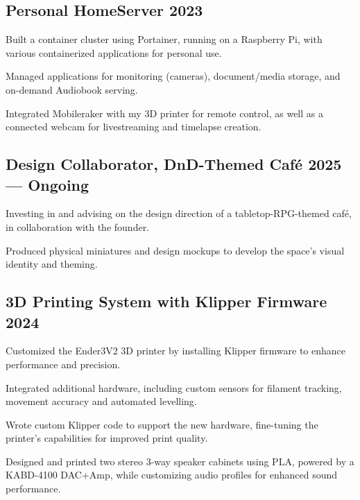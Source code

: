 \subsection{\texorpdfstring{Personal HomeServer \hfill 2023}{Personal HomeServer - 2023}}
\begin{zitemize}
\item Built a container cluster using Portainer, running on a Raspberry Pi, with various containerized applications for personal use.
\item Managed applications for monitoring (cameras), document/media storage, and on-demand Audiobook serving.
\item Integrated Mobileraker with my 3D printer for remote control, as well as a connected webcam for livestreaming and timelapse creation.
\end{zitemize}

\subsection{\texorpdfstring{Design Collaborator, DnD-Themed Caf\'{e} \hfill 2025 --- Ongoing}{Design Collaborator, DnD-Themed Cafe - 2025 - Ongoing}}
\begin{zitemize}
\item Investing in and advising on the design direction of a tabletop-RPG-themed caf\'{e}, in collaboration with the founder.
\item Produced physical miniatures and design mockups to develop the space's visual identity and theming.
\end{zitemize}

\subsection{\texorpdfstring{3D Printing System with Klipper Firmware \hfill 2024}{3D Printing System with Klipper Firmware - 2024}}
\begin{zitemize}
\item Customized the Ender3V2 3D printer by installing Klipper firmware to enhance performance and precision.
\item Integrated additional hardware, including custom sensors for filament tracking, movement accuracy and automated levelling.
\item Wrote custom Klipper code to support the new hardware, fine-tuning the printer's capabilities for improved print quality.
\item Designed and printed two stereo 3-way speaker cabinets using PLA, powered by a KABD-4100 DAC+Amp, while customizing audio profiles for enhanced sound performance.
\end{zitemize}
